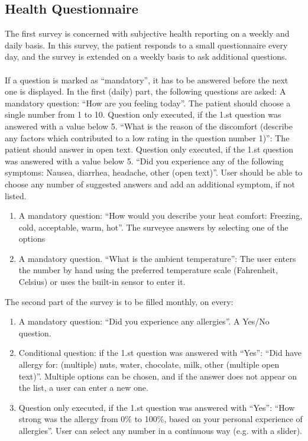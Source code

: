 \subsection{Health Questionnaire}
\label{subsec:healthquestionnaire}
The first survey is concerned with subjective health reporting on a weekly and daily basis. In this survey, the patient responds to a small questionnaire every day, and the survey is extended on a weekly basis to ask additional questions.\\\\
If a question is marked as ``mandatory'', it has to be answered before the next one is displayed.
In the first (daily) part, the following questions are asked:
A mandatory question: ``How are you feeling today''. The patient should choose a single number from 1 to 10.
Question only executed, if the 1.st question was answered with a value below 5. ``What is the reason of the discomfort (describe any factors which contributed to a low rating in the question number 1)'': The patient should answer in open text.
Question only executed, if the 1.st question was answered with a value below 5. ``Did you experience any of the following symptoms: Nausea, diarrhea, headache, other (open text)”. User should be able to choose any number of suggested answers and add an additional symptom, if not listed.
\begin{enumerate}
  \item A mandatory question: ``How would you describe your heat comfort: Freezing, cold, acceptable, warm, hot''. The surveyee answers by selecting one of the options
  \item A mandatory question. ``What is the ambient temperature'': The user enters the number by hand using the preferred temperature scale (Fahrenheit, Celsius) or uses the built-in sensor to enter it.
\end{enumerate}
\noindent
The second part of the survey is to be filled monthly, on every:

\begin{enumerate}

\item A mandatory question: ``Did you experience any allergies''. A Yes/No question.
\item Conditional question: if the 1.st question was answered with ``Yes'': ``Did have allergy for: (multiple) nuts, water, chocolate, milk, other (multiple open text)''. Multiple options can be chosen, and if the answer does not appear on the list, a user can enter a new one.
\item Question only executed, if the 1.st question was answered with ``Yes'': ``How strong was the allergy from 0\% to 100\%, based on your personal experience of allergies''. User can select any number in a continuous way (e.g. with a slider).
\end{enumerate}


